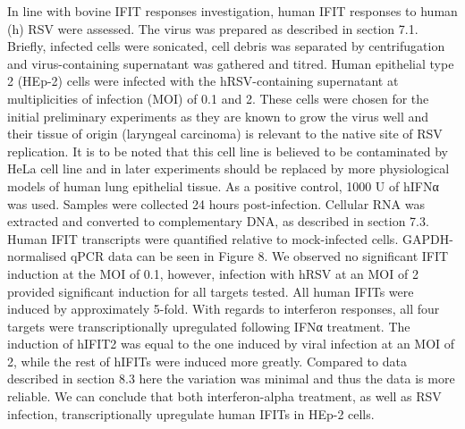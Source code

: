 In line with bovine IFIT responses investigation, human IFIT responses to human (h) RSV were assessed. The virus was prepared as described in section 7.1. Briefly, infected cells were sonicated, cell debris was separated by centrifugation and virus-containing supernatant was gathered and titred. Human epithelial type 2 (HEp-2) cells were infected with the hRSV-containing supernatant at multiplicities of infection (MOI) of 0.1 and 2. These cells were chosen for the initial preliminary experiments as they are known to grow the virus well and their tissue of origin (laryngeal carcinoma) is relevant to the native site of RSV replication. It is to be noted that this cell line is believed to be contaminated by HeLa cell line and in later experiments should be replaced by more physiological models of human lung epithelial tissue. As a positive control, 1000 U of hIFNα was used. Samples were collected 24 hours post-infection. Cellular RNA was extracted and converted to complementary DNA, as described in section 7.3. Human IFIT transcripts were quantified relative to mock-infected cells. GAPDH-normalised qPCR data can be seen in Figure 8. We observed no significant IFIT induction at the MOI of 0.1, however, infection with hRSV at an MOI of 2 provided significant induction for all targets tested. All human IFITs were induced by approximately 5-fold. With regards to interferon responses, all four targets were transcriptionally upregulated following IFNα treatment. The induction of hIFIT2 was equal to the one induced by viral infection at an MOI of 2, while the rest of hIFITs were induced more greatly. Compared to data described in section 8.3 here the variation was minimal and thus the data is more reliable. We can conclude that both interferon-alpha treatment, as well as RSV infection, transcriptionally upregulate human IFITs in HEp-2 cells.

